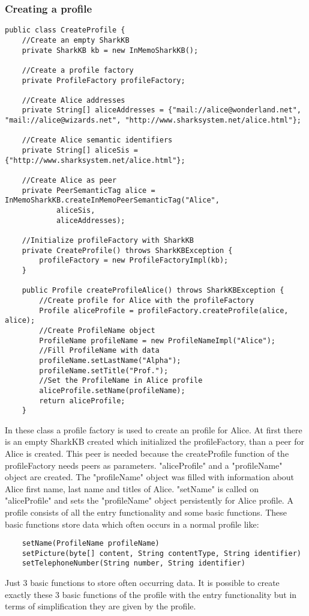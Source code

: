 \subsubsection{Creating a profile}
\begin{verbatim}
public class CreateProfile {
	//Create an empty SharkKB
    private SharkKB kb = new InMemoSharkKB();
    
    //Create a profile factory
    private ProfileFactory profileFactory;
    
    //Create Alice addresses
    private String[] aliceAddresses = {"mail://alice@wonderland.net", "mail://alice@wizards.net", "http://www.sharksystem.net/alice.html"};
    
    //Create Alice semantic identifiers 
    private String[] aliceSis = {"http://www.sharksystem.net/alice.html"};
    
    //Create Alice as peer
    private PeerSemanticTag alice = InMemoSharkKB.createInMemoPeerSemanticTag("Alice",
            aliceSis,
            aliceAddresses);
            
    //Initialize profileFactory with SharkKB
    private CreateProfile() throws SharkKBException {
        profileFactory = new ProfileFactoryImpl(kb);
    }

    public Profile createProfileAlice() throws SharkKBException {
    	//Create profile for Alice with the profileFactory
        Profile aliceProfile = profileFactory.createProfile(alice, alice);
        //Create ProfileName object
        ProfileName profileName = new ProfileNameImpl("Alice");
		//Fill ProfileName with data
        profileName.setLastName("Alpha");
        profileName.setTitle("Prof.");
		//Set the ProfileName in Alice profile
        aliceProfile.setName(profileName);
        return aliceProfile;
    }
\end{verbatim}

In these class a profile factory is used to create an profile for Alice. At first there is an empty SharkKB created which initialized the profileFactory, than a peer for Alice is created.
This peer is needed because the createProfile function of the profileFactory needs peers as parameters. "aliceProfile" and a "profileName" object are created. The "profileName" object was filled with information about Alice first name, last name and titles of Alice. "setName" is called on "aliceProfile" and sets the "profileName" object persistently for Alice profile.
A profile consists of all the entry functionality and some basic functions. These basic functions store data which often occurs in a normal profile like:
\begin{verbatim}
	setName(ProfileName profileName) 
	setPicture(byte[] content, String contentType, String identifier)
	setTelephoneNumber(String number, String identifier)
\end{verbatim}
Just 3 basic functions to store often occurring data. It is possible to create exactly these 3 basic functions of the profile with the entry functionality but in terms of simplification they are given by the profile.

